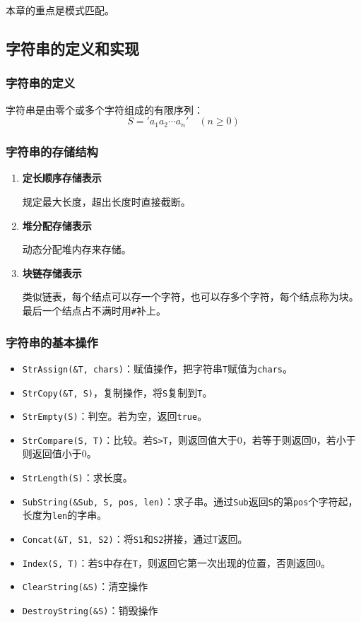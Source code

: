 \documentclass[12pt, a4paper, oneside]{ctexart}
\begin{document}
本章的重点是模式匹配。

\subsection{字符串的定义和实现}

\subsubsection{字符串的定义}

字符串是由零个或多个字符组成的有限序列：
\begin{equation*}
  S='a_1 a_2 \cdots a_n'\quad (n\geq 0)
\end{equation*}

\subsubsection{字符串的存储结构}

\begin{enumerate}
  \item {\bf 定长顺序存储表示}
  
  规定最大长度，超出长度时直接截断。

  \item {\bf 堆分配存储表示}
  
  动态分配堆内存来存储。

  \item {\bf 块链存储表示}
  
  类似链表，每个结点可以存一个字符，也可以存多个字符，每个结点称为块。最后一个结点占不满时用\verb|#|补上。
\end{enumerate}

\subsubsection{字符串的基本操作}

\begin{itemize}
  \item \verb|StrAssign(&T, chars)|：赋值操作，把字符串\verb|T|赋值为\verb|chars|。
  \item \verb|StrCopy(&T, S)|，复制操作，将\verb|S|复制到\verb|T|。
  \item \verb|StrEmpty(S)|：判空。若为空，返回\verb|true|。
  \item \verb|StrCompare(S, T)|：比较。若\verb|S>T|，则返回值大于0，若等于则返回0，若小于则返回值小于0。
  \item \verb|StrLength(S)|：求长度。
  \item \verb|SubString(&Sub, S, pos, len)|：求子串。通过\verb|Sub|返回\verb|S|的第\verb|pos|个字符起，长度为\verb|len|的字串。
  \item \verb|Concat(&T, S1, S2)|：将\verb|S1|和\verb|S2|拼接，通过\verb|T|返回。
  \item \verb|Index(S, T)|：若\verb|S|中存在\verb|T|，则返回它第一次出现的位置，否则返回0。
  \item \verb|ClearString(&S)|：清空操作
  \item \verb|DestroyString(&S)|：销毁操作
\end{itemize}
\end{document}
